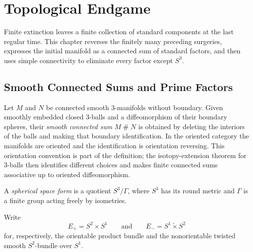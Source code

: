\chapter{Topological Endgame}

Finite extinction leaves a finite collection of standard components at the
last regular time.  This chapter reverses the finitely many preceding
surgeries, expresses the initial manifold as a connected sum of standard
factors, and then uses simple connectivity to eliminate every factor except
$S^3$.

\section{Smooth Connected Sums and Prime Factors}

\begin{definition}
\label{def:smooth-connected-sum}
\notready
Let $M$ and $N$ be connected smooth $3$-manifolds without boundary.  Given
smoothly embedded closed $3$-balls and a diffeomorphism of their boundary
spheres, their \emph{smooth connected sum} $M\mathbin{\#}N$ is obtained by
deleting the interiors of the balls and making that boundary identification.
In the oriented category the manifolds are oriented and the identification is
orientation reversing.  This orientation convention is part of the definition;
the isotopy-extension theorem for $3$-balls then identifies different choices
and makes finite connected sums associative up to oriented diffeomorphism.
\end{definition}

\begin{definition}
\label{def:spherical-space-form}
\notready
A \emph{spherical space form} is a quotient $S^3/\Gamma$, where $S^3$ has
its round metric and $\Gamma$ is a finite group acting freely by isometries.
\end{definition}

\begin{definition}
\label{def:sphere-bundles-over-circle}
\notready
Write
\[
 E_+=S^2\times S^1
 \qquad\text{and}\qquad
 E_-=S^1\mathbin{\widetilde\times}S^2
\]
for, respectively, the orientable product bundle and the nonorientable
twisted smooth $S^2$-bundle over $S^1$.
\end{definition}

